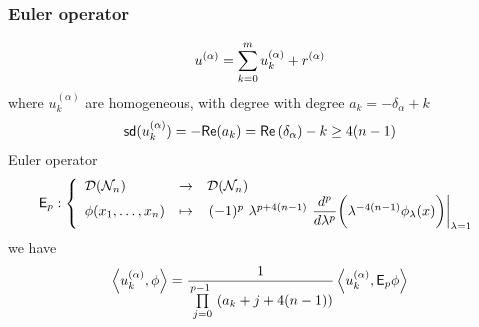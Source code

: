 \documentclass[9pt]{beamer}
\newcommand{\sm}[1]{\left\langle #1 \right\rangle}
\renewcommand{\Re}{\mathsf{Re}}
\newcommand{\sd}{\mathsf{sd}}
\newcommand{\Dcal}{\mathcal{D}}
\newcommand{\Ncal}{\mathcal{N}}
\newcommand{\Esf}{\mathsf{E}}
\begin{document}
\begin{frame}[label=details_theorem]

\frametitle{Euler operator}
\vfill

\vspace*{-5pt}
\begin{equation*}
u^{(\alpha)}  = \sum_{k=0}^m u^{(\alpha)}_k + r^{(\alpha)}
\vspace*{-5pt}
\end{equation*}
%
where $u^{(\alpha)}_k$ are homogeneous, with degree with degree $a_k = - \delta_\alpha + k$
%
\vspace*{-5pt}
\begin{equation*}
\sd(u^{(\alpha)}_k) = - \Re(a_k)  =\Re\left(\delta_\alpha\right) - k \geq 4(n-1)
\vspace*{-5pt}
\end{equation*}
%
Euler operator
%
\vspace*{-5pt}
\begin{equation*}
\Esf_p : \left\{
\begin{array}{lcl}
\Dcal(\Ncal_n) & \to & \Dcal(\Ncal_n) \\
\phi(x_1,\dots, x_n) & \mapsto & \left. (-1)^p \ \lambda^{p+4(n-1)} \ \dfrac{d^p}{d\lambda^p} \bigg( \lambda^{-4(n-1)}  \phi_\lambda(x) \bigg) \right|_{\lambda = 1}
\end{array}
\right.
\vspace*{-5pt}
\end{equation*}
%
we have
%
\vspace*{-5pt}
\begin{equation*}
\sm{ u^{(\alpha)}_k, \phi } = \frac{1}{\overset{p-1}{\ \underset{j=0}{\prod}} \ (a_k+j+4(n-1))}   \sm{ u^{(\alpha)}_k, \Esf_p \phi }
\vspace*{-5pt}
\end{equation*}

\vfill

\hfill\hyperlink{theorem}{}

\end{frame}

\end{document}
